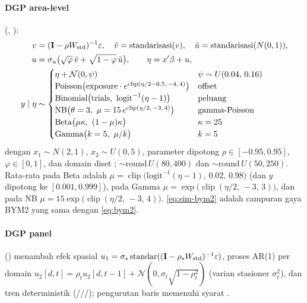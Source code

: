 \paragraph{DGP area-level} (, ):
\begin{align}
  v&=(\Imat-\rho W_{\text{std}})^{-1}\varepsilon,\quad
    \tilde v=\text{standarisasi}(v),\quad
    \tilde u=\text{standarisasi}(N(0,1)),\label{eq:sim-spatial}\\
  u&=\sigma_u\bigl(\sqrt{\varphi}\,\tilde v+\sqrt{1-\varphi}\,\tilde u\bigr),
    \qquad
    \eta=x'\beta+u, \label{eq:sim-bym2}\\
  y\mid\eta&\sim
    \begin{cases}
      \eta+\mathcal N(0,\psi) & \psi\sim U(0.04,\,0.16)\\
      \text{Poisson}\bigl(\text{exposure}\cdot
        e^{\operatorname{clip}(\eta/2-0.5,\,-4,\,4)}\bigr) & \text{offset}\\
      \text{Binomial}\bigl(\text{trials},\ \mathrm{logit}^{-1}(\eta-1)\bigr) & \text{peluang}\\
      \text{NB}\bigl(\theta=3,\ \mu=15\,e^{\operatorname{clip}(\eta/2,\,-3,\,4)}\bigr) &
        \text{gamma-Poisson}\\
      \text{Beta}\bigl(\mu\kappa,\ (1-\mu)\kappa\bigr) & \kappa=25\\
      \text{Gamma}\bigl(k=5,\ \mu/k\bigr) & k=5
    \end{cases}
    \label{eq:sim-resp}
\end{align}
dengan $x_1\sim N(2,1)$, $x_2\sim U(0,5)$, parameter dipotong
$\rho\in[-0.95,0.95]$, $\varphi\in[0,1]$, dan  domain
diset ;  $\sim\mathrm{round}\,U(80,400)$ dan
 $\sim\mathrm{round}\,U(50,250)$. Rata-rata pada Beta adalah
$\mu=\operatorname{clip}\bigl(\mathrm{logit}^{-1}(\eta-1),\,0.02,\,0.98\bigr)$
(dan $y$ dipotong ke $[0.001,0.999]$), pada Gamma
$\mu=\exp\bigl(\operatorname{clip}(\eta/2,\,-3,\,3)\bigr)$, dan pada NB
$\mu=15\exp\bigl(\operatorname{clip}(\eta/2,\,-3,\,4)\bigr)$. \eqref{eq:sim-bym2} adalah campuran gaya BYM2 yang sama
dengan \eqref{eq:bym2}.

\paragraph{DGP panel} () menambah efek spasial
$u_1=\sigma_s\,\text{standar}((\mathbf{I}-\rho_sW_{\text{std}})^{-1}\varepsilon)$,
proses AR(1) per domain $u_2[d,t]=\rho_t u_2[d,t-1]+\mathcal N(0,\sigma_t\sqrt{1-\rho_t^2})$
(varian stasioner $\sigma_t^2$), dan tren deterministik
(///); pengurutan baris
 memenuhi syarat .

